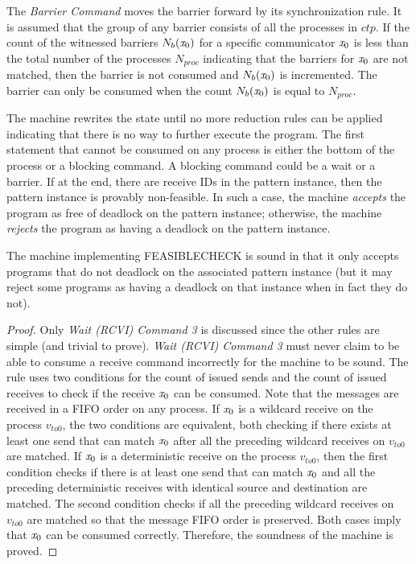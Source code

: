 The \emph{Barrier Command} moves the barrier forward by its synchronization rule. It is assumed that the group of any barrier consists of all the processes in $\mathit{ctp}$. 
If the count of the witnessed barriers $\textit{$N_b$}(\mathit{x}_0)$ for a specific communicator $\mathit{x}_0$ is less than the total number of the processes $N_{proc}$ indicating that the barriers for $\mathit{x}_0$ are not matched, then the barrier is not consumed and $\textit{$N_b$}(\mathit{x}_0)$ is incremented. The barrier can only be consumed when the count $\textit{$N_b$}(\mathit{x}_0)$ is equal to $N_{proc}$.

The machine rewrites the state until no more reduction rules can be applied indicating that there is no way to further execute the program. The first statement that cannot be consumed on any process is either the bottom of the process or a blocking command. A blocking command could be a wait or a barrier. If at the end, there are receive IDs in the pattern instance, then the pattern instance is provably non-feasible. In such a case, the machine \emph{accepts} the program as free of deadlock on the pattern instance; otherwise, the machine \emph{rejects} the program as having a deadlock on the pattern instance.

\begin{lemma}
  The machine implementing \textrm{FEASIBLECHECK} is sound in that it
  only accepts programs that do not deadlock on the associated pattern
  instance (but it may reject some programs as having a deadlock on
  that instance when in fact they do not).
\label{lemma:sound}
\end{lemma}
\begin{proof}
  Only \emph{Wait (RCVI) Command 3} is discussed since the
  other rules are simple (and trivial to prove). \emph{Wait (RCVI) Command 3} must never
  claim to be able to consume a receive command incorrectly for
  the machine to be sound. The rule uses two conditions for the count of issued sends and the count of issued receives to check if the receive $\mathit{x}_0$ can be consumed. Note that the messages are received in a FIFO order on any process. If $\mathit{x}_0$ is a wildcard receive on the process $v_{to0}$, the two conditions are equivalent, both checking if there exists at least one send that can match $\mathit{x}_0$ after all the preceding wildcard receives on $v_{to0}$ are matched. 
If $\mathit{x}_0$ is a deterministic receive on the process $v_{to0}$, then the first condition checks if there is at least one send that can match $\mathit{x}_0$ and all the preceding deterministic receives with identical source and destination are matched. The second condition checks if all the preceding wildcard receives on $v_{to0}$ are matched so that the message FIFO order is preserved. Both cases imply that $\mathit{x}_0$ can be consumed correctly. Therefore, the soundness of the machine is proved.  
\end{proof}

